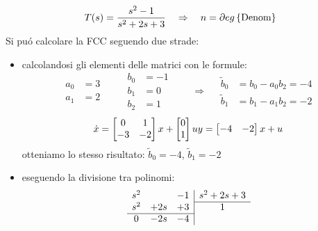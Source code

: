 \documentclass[../main.tex]{subfiles}
\begin{document}
		\begin{mdframed}[style=Exercise]
			\begin{Exercise}[title={Calcolare la forma compagna controllabile}, difficulty=1]
				\[
					T(s) = \dfrac{s^2-1}{s^2+2s+3} \quad\Rightarrow\quad n = \partial eg \left\lbrace \text{Denom} \right\rbrace
				\]
				Si pu\'o calcolare la FCC seguendo due strade:
				\begin{itemize}
					\item 
						calcolandosi gli elementi delle matrici con le formule:
						\[
							\begin{aligned}
								a_0 &= 3\\
								a_1 &= 2
							\end{aligned}
							\qquad
							\begin{aligned}
								b_0 &= -1\\
								b_1 &= 0\\
								b_2 &= 1
							\end{aligned}
							\qquad\Rightarrow\quad
							\begin{aligned}
								\tilde b_0 &= b_0 - a_0 b_2 = -4\\
								\tilde b_1 &= b_1 - a_1 b_2 = -2
							\end{aligned}
						\]
						\[
							\dot x = 
							\begin{bmatrix}
								0 & 1\\
								-3 & -2
							\end{bmatrix} x+
							\begin{bmatrix}
								0\\
								1
							\end{bmatrix} u
							\\
							y =
							\begin{bmatrix}
								-4 & -2
							\end{bmatrix} x + u
						\]
						otteniamo lo stesso risultato: $ \tilde b_0 = -4 $, $ \tilde b_1 = -2 $
					\item 
						eseguendo la divisione tra polinomi:
						\[
							\begin{array}{ccc|c}
								s^2 & & -1 & s^2 + 2s + 3
								\\\cline{4-4}
								s^2 & +2s & +3 & 1
								\\\cline{1-3}
								0 & -2s & -4 &
							\end{array}
						\]
				\end{itemize} 
			\end{Exercise}
		\end{mdframed}
\end{document}
